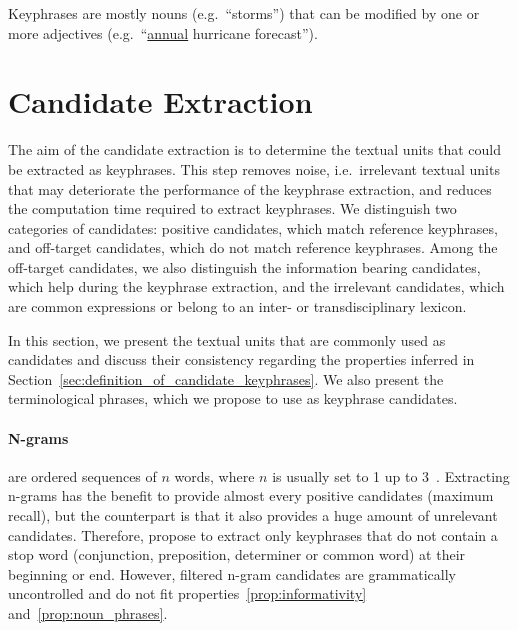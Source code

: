     \begin{property}\label{prop:noun_phrases}
      Keyphrases are mostly nouns (e.g.~``storms'') that can be modified by one
      or more adjectives (e.g.~``\underline{annual} hurricane forecast'').
    \end{property}


\section{Candidate Extraction}
\label{sec:candidate_extraction}
  The aim of the candidate extraction is to determine the textual units that
  could be extracted as keyphrases. This step removes noise, i.e.~irrelevant
  textual units that may deteriorate the performance of the keyphrase
  extraction, and reduces the computation time required to extract  keyphrases.
  We distinguish two categories of candidates: positive candidates, which match
  reference keyphrases, and off-target candidates, which do not match reference
  keyphrases. Among the off-target candidates, we also distinguish the
  information bearing candidates, which help during the keyphrase extraction,
  and the irrelevant candidates, which are common expressions or belong to an
  inter- or transdisciplinary lexicon.

  In this section, we present the textual units that are commonly used as
  candidates and discuss their consistency regarding the properties inferred in
  Section~\ref{sec:definition_of_candidate_keyphrases}. We also present the
  terminological phrases, which we propose to use as keyphrase candidates.

  \paragraph{N-grams} are ordered sequences of $n$ words, where $n$ is usually
  set to 1 up to
  3~\cite{witten1999kea,turney1999learningalgorithms,hulth2003keywordextraction}.
  Extracting n-grams has the benefit to provide almost every positive candidates
  (maximum recall), but the counterpart is that it also provides a huge amount
  of unrelevant candidates. Therefore,  propose to
  extract only keyphrases that do not contain a stop word (conjunction,
  preposition, determiner or common word) at their beginning or end. However,
  filtered n-gram candidates are grammatically uncontrolled and do not fit
  properties~\ref{prop:informativity} and~\ref{prop:noun_phrases}.

